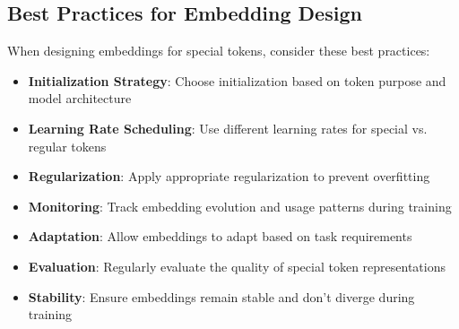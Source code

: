 \subsection{Best Practices for Embedding Design}

When designing embeddings for special tokens, consider these best practices:

\begin{itemize}
\item \textbf{Initialization Strategy}: Choose initialization based on token purpose and model architecture
\item \textbf{Learning Rate Scheduling}: Use different learning rates for special vs. regular tokens
\item \textbf{Regularization}: Apply appropriate regularization to prevent overfitting
\item \textbf{Monitoring}: Track embedding evolution and usage patterns during training
\item \textbf{Adaptation}: Allow embeddings to adapt based on task requirements
\item \textbf{Evaluation}: Regularly evaluate the quality of special token representations
\item \textbf{Stability}: Ensure embeddings remain stable and don't diverge during training
\end{itemize}
\begin{comment}
Feedback: This is a good list. To make it more actionable:
1.  **Initialization Strategy**: "Default to 'semantic initialization' (averaging related words) when possible. If not, use 'mean initialization'. Use 'random initialization' only as a last resort and with a small standard deviation."
2.  **Learning Rate Scheduling**: "When fine-tuning, use a 10x to 100x smaller learning rate for the pre-trained model weights compared to the learning rate for your newly added special token embeddings and any new output layers."
3.  **Monitoring**: "During training, log the norm (magnitude) of your special token embeddings. If a token's norm is exploding or shrinking to zero, it's a sign of instability. Consider applying L2 regularization or gradient clipping to stabilize it."
\end{comment}
